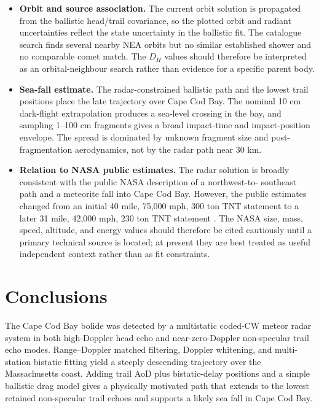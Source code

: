 \begin{itemize}
  \item \textbf{Orbit and source association.}  The current orbit solution is
  propagated from the ballistic head/trail covariance, so the plotted orbit and
  radiant uncertainties reflect the state uncertainty in the ballistic fit.
  The catalogue search finds several nearby NEA orbits but no similar
  established shower and no comparable comet match.  The \(D_H\) values should
  therefore be interpreted as an orbital-neighbour search rather than evidence
  for a specific parent body.

  \item \textbf{Sea-fall estimate.}  The radar-constrained ballistic path and
  the lowest trail positions place the late trajectory over Cape Cod Bay.  The
  nominal 10 cm dark-flight extrapolation produces a sea-level crossing in the
  bay, and sampling 1--100 cm fragments gives a broad impact-time and
  impact-position envelope.  The spread is dominated by unknown fragment size
  and post-fragmentation aerodynamics, not by the radar path near 30 km.

  \item \textbf{Relation to NASA public estimates.}  The radar solution is
  broadly consistent with the public NASA description of a northwest-to-
  southeast path and a meteorite fall into Cape Cod Bay.  However, the public
  estimates changed from an initial 40 mile, 75,000 mph, 300 ton TNT statement
  to a later 31 mile, 42,000 mph, 230 ton TNT statement
  \cite{afp_2026_new_england_meteor,ap_2026_new_england_meteor}.  The NASA
  size, mass, speed, altitude, and energy values should therefore be cited
  cautiously until a primary technical source is located; at present they are
  best treated as useful independent context rather than as fit constraints.
\end{itemize}

\section{Conclusions}

The Cape Cod Bay bolide was detected by a multistatic coded-CW meteor radar
system in both high-Doppler head echo and near-zero-Doppler non-specular trail
echo modes.  Range--Doppler matched filtering, Doppler whitening, and
multi-station bistatic fitting yield a steeply descending trajectory over the
Massachusetts coast.  Adding trail AoD plus bistatic-delay positions and a
simple ballistic drag model gives a physically motivated path that extends to
the lowest retained non-specular trail echoes and supports a likely sea fall
in Cape Cod Bay.


